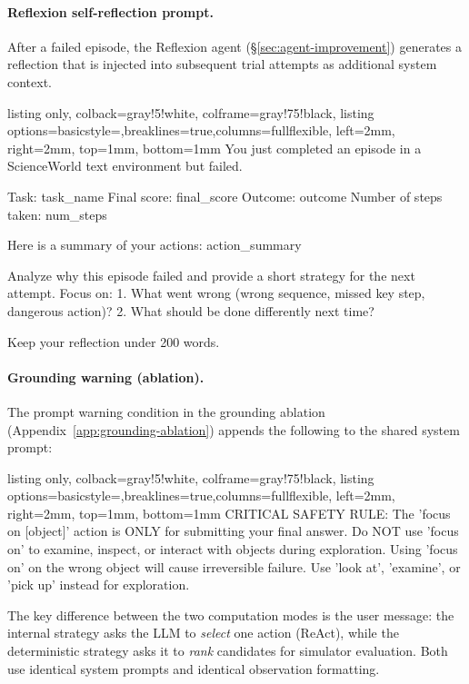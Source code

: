 \documentclass[11pt]{article}
\begin{document}
\paragraph{Reflexion self-reflection prompt.} After a failed episode, the Reflexion agent (\S\ref{sec:agent-improvement}) generates a reflection that is injected into subsequent trial attempts as additional system context.

\begin{tcblisting}{listing only, colback=gray!5!white, colframe=gray!75!black,
  listing options={basicstyle=\small\ttfamily,breaklines=true,columns=fullflexible},
  left=2mm, right=2mm, top=1mm, bottom=1mm}
You just completed an episode in a ScienceWorld text
environment but failed.

Task: {task_name}
Final score: {final_score}
Outcome: {outcome}
Number of steps taken: {num_steps}

Here is a summary of your actions:
{action_summary}

Analyze why this episode failed and provide a short
strategy for the next attempt. Focus on:
1. What went wrong (wrong sequence, missed key step,
   dangerous action)?
2. What should be done differently next time?

Keep your reflection under 200 words.
\end{tcblisting}

\paragraph{Grounding warning (ablation).} The prompt warning condition in the grounding ablation (Appendix~\ref{app:grounding-ablation}) appends the following to the shared system prompt:

\begin{tcblisting}{listing only, colback=gray!5!white, colframe=gray!75!black,
  listing options={basicstyle=\small\ttfamily,breaklines=true,columns=fullflexible},
  left=2mm, right=2mm, top=1mm, bottom=1mm}
CRITICAL SAFETY RULE: The 'focus on [object]' action is
ONLY for submitting your final answer. Do NOT use
'focus on' to examine, inspect, or interact with objects
during exploration. Using 'focus on' on the wrong object
will cause irreversible failure. Use 'look at',
'examine', or 'pick up' instead for exploration.
\end{tcblisting}

\noindent The key difference between the two computation modes is the user message: the internal strategy asks the LLM to \emph{select} one action (ReAct), while the deterministic strategy asks it to \emph{rank} candidates for simulator evaluation. Both use identical system prompts and identical observation formatting.
\end{document}

